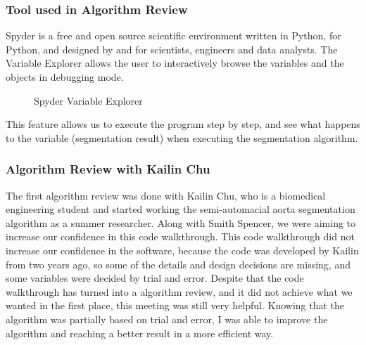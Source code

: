 \subsubsection{Tool used in Algorithm Review}

Spyder is a free and open source scientific environment written in Python, for Python, and designed by and for scientists, engineers and data analysts. The Variable Explorer allows the user to interactively browse the variables and the objects in debugging mode. 
\citep{Spyder}

\begin{figure}[H]
    \centering
    \caption[Spyder Variable Explorer]{Spyder Variable Explorer \cite{raybaut2009spyder}}
    \label{fig_spyder_ve}
\end{figure}

This feature allows us to execute the program step by step, and see what happens to the variable (segmentation result) when executing the segmentation algorithm. 


\subsubsection{Algorithm Review with Kailin Chu}
The first algorithm review was done with Kailin Chu, who is a biomedical engineering student and started working the semi-automacial aorta segmentation algorithm as a summer researcher. Along with Smith Spencer, we were aiming to increase our confidence in this code walkthrough. This code walkthrough did not increase our confidence in the software, because the code was developed by Kailin from two years ago, so some of the details and design decisions are missing, and some variables were decided by trial and error. Despite that the code walkthrough has turned into a algorithm review, and it did not achieve what we wanted in the first place, this meeting was still very helpful. Knowing that the algorithm was partially based on trial and error, I was able to improve the algorithm and reaching a better result in a more efficient way.

